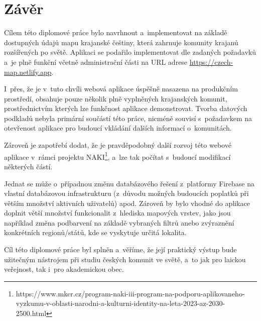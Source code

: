 \hypertarget{zuxe1vux11br}{%
\chapter*{Závěr}\label{zaver}}

Cílem této diplomové práce bylo navrhnout a~implementovat na základě dostupných údajů mapu krajanské češtiny, která zahrnuje komunity krajanů rozšířených po světě. Aplikaci se podařilo implementovat dle zadaných požadavků a~je plně funkční včetně administrační části na URL adrese \url{https://czech-map.netlify.app}.

I~přes, že je v~tuto chvíli webová aplikace úspěšně nasazena na produkčním prostředí, obsahuje pouze několik plně vyplněných krajanských komunit, prostřednictvím kterých lze funkčnost aplikace demonstrovat. Tvorba datových podkladů nebyla primární součástí této práce, nicméně souvisí s~požadavkem na otevřenost aplikace pro budoucí vkládání dalších informací o~komunitách.

Zároveň je zapotřebí dodat, že je pravděpodobný další rozvoj této webové aplikace v~rámci projektu NAKI\footnote{https://www.mkcr.cz/program-naki-iii-program-na-podporu-aplikovaneho-vyzkumu-v-oblasti-narodni-a-kulturni-identity-na-leta-2023-az-2030-2500.html}, a~lze tak počítat s~budoucí modifikací některých částí.

Jednat se může o~případnou změnu databázového řešení z~platformy Firebase na vlastní databázovou infrastrukturu (z~důvodu možných budoucích poplatků při větším množství aktivních uživatelů) apod. Zároveň by bylo vhodné do aplikace doplnit větší množství funkcionalit z~hlediska mapových vrstev, jako jsou například změna podbarvení na základě vybraných filtrů anebo zvýraznění konkrétních regionů/států, kde se vyskytuje určitá lokalita.

Cíl této diplomové práce byl splněn a~věříme, že její praktický výstup bude užitečným nástrojem při studiu českých komunit ve světě, a~to jak pro laickou veřejnost, tak i~pro akademickou obec.
